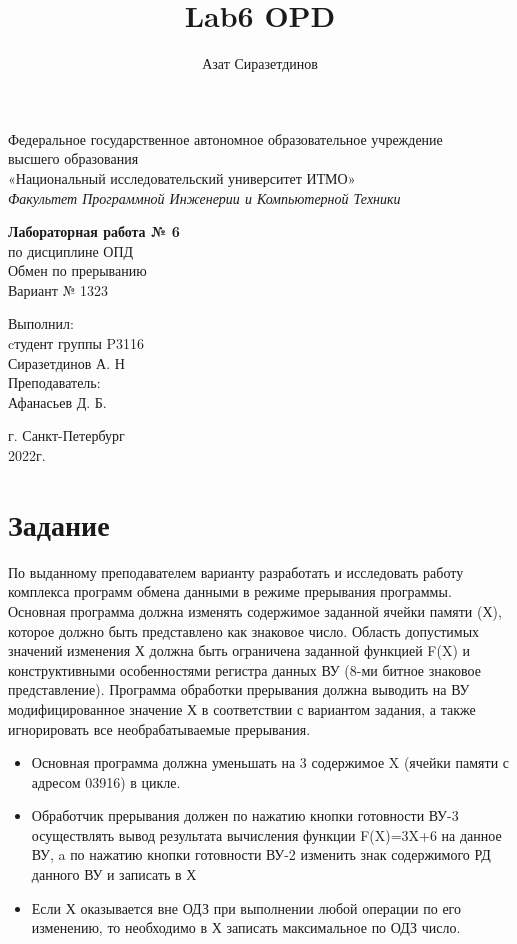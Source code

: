 \documentclass[12pt]{article}
\title{Lab6 OPD}
\author{Азат Сиразетдинов}
\begin{document}
	\thispagestyle{empty}
	\begin{center}
		Федеральное государственное автономное образовательное учреждение\\ 
		высшего образования\\
		«Национальный исследовательский университет ИТМО»\\
		\textit{Факультет Программной Инженерии и Компьютерной Техники}\\
	\end{center}
	\vspace{2cm}
	\begin{center}
		\large
		\textbf{Лабораторная работа № 6}\\
		по дисциплине ОПД\\
		Обмен по прерыванию\\
		Вариант № 1323
	\end{center}
	\vspace{7cm}
	\begin{flushright}
		Выполнил:\\
		cтудент  группы P3116\\
		Сиразетдинов А. Н\\
		Преподаватель: \\
		Афанасьев Д. Б.\\
	\end{flushright}
	\vspace{6cm}
	\begin{center}
		г. Санкт-Петербург\\
		2022г.
	\end{center}
	\newpage
	
	\tableofcontents
	
	\newpage
	\section{Задание}
	
	По выданному преподавателем варианту разработать и исследовать работу комплекса программ обмена данными в режиме прерывания программы. Основная программа должна изменять содержимое заданной ячейки памяти (Х), которое должно быть представлено как знаковое число. Область допустимых значений изменения Х должна быть ограничена заданной функцией F(X) и конструктивными особенностями регистра данных ВУ (8-ми битное знаковое представление). Программа обработки прерывания должна выводить на ВУ модифицированное значение Х в соответствии с вариантом задания, а также игнорировать все необрабатываемые прерывания.
	\begin{itemize}
		\item Основная программа должна уменьшать на 3 содержимое X (ячейки памяти с адресом 03916) в цикле.
		\item Обработчик прерывания должен по нажатию кнопки готовности ВУ-3 осуществлять вывод результата вычисления функции F(X)=3X+6 на данное ВУ, a по нажатию кнопки готовности ВУ-2 изменить знак содержимого РД данного ВУ и записать в Х
		\item Если Х оказывается вне ОДЗ при выполнении любой операции по его изменению, то необходимо в Х записать максимальное по ОДЗ число.
	\end{itemize}
	\newpage
	
\end{document}
